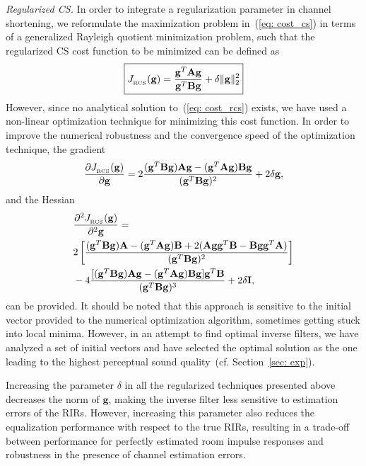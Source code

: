 \documentclass{article}
\begin{document}
\smallskip \noindent \textit{Regularized CS.} \enspace In order to integrate a regularization parameter in channel shortening, we reformulate the maximization problem in~(\ref{eq: cost_cs}) in terms of a generalized Rayleigh quotient minimization problem, such that the regularized CS cost function to be minimized can be defined as
\begin{equation}
\label{eq: cost_rcs}
\boxed{J_{{}_{\rm RCS}}(\mathbf{g})= \frac{\mathbf{g}^T {\mathbf{A}} \mathbf{g}}{\mathbf{g}^T {\mathbf{B}} \mathbf{g}} + \delta \|\mathbf{g} \|_2^2}
\end{equation}
However, since no analytical solution to~(\ref{eq: cost_rcs}) exists, we have used a non-linear optimization technique for minimizing this cost function.
In order to improve the numerical robustness and the convergence speed of the optimization technique, the gradient
\begin{equation}
\frac{\partial J_{{}_{\rm RCS}}(\mathbf{g})}{\partial \mathbf{g}} = 2 \frac{(\mathbf{g}^T \mathbf{B} \mathbf{g})\mathbf{A}\mathbf{g} - (\mathbf{g}^T \mathbf{A} \mathbf{g})\mathbf{B}\mathbf{g} }{(\mathbf{g}^T \mathbf{B} \mathbf{g})^2} + 2 \delta \mathbf{g},
\end{equation}
and the Hessian
\begin{equation}
\begin{split}
& \frac{\partial ^2 J_{{}_{\rm RCS}}(\mathbf{g})}{\partial^2 \mathbf{g}}  = \\
& 2 \left[ \frac{(\mathbf{g}^T \mathbf{B} \mathbf{g}) \mathbf{A} - (\mathbf{g}^T \mathbf{A} \mathbf{g}) \mathbf{B} + 2 ( \mathbf{A} \mathbf{g} \mathbf{g}^T \mathbf{B} - \mathbf{B} \mathbf{g} \mathbf{g}^T \mathbf{A})}{(\mathbf{g}^T \mathbf{B}\mathbf{g})^2} \right] \\
& -  4 \frac{[(\mathbf{g}^T\mathbf{B}\mathbf{g})\mathbf{A}\mathbf{g} - (\mathbf{g}^T\mathbf{A}\mathbf{g})\mathbf{B}\mathbf{g}] \mathbf{g}^T \mathbf{B}}{(\mathbf{g}^T\mathbf{B}\mathbf{g})^3} + 2 \delta \mathbf{I},
\end{split}
\end{equation}
can be provided. 
It should be noted that this approach is sensitive to the initial vector provided to the numerical optimization algorithm, sometimes getting stuck into local minima.
However, in an attempt to find optimal inverse filters, we have analyzed a set of initial vectors and have selected the optimal solution as the one leading to the highest perceptual sound quality~(cf. Section~\ref{sec: exp}).

Increasing the parameter $\delta$ in all the regularized techniques presented above decreases the norm of $\mathbf{g}$, making the inverse filter less sensitive to estimation errors of the RIRs. 
However, increasing this parameter also reduces the equalization performance with respect to the true RIRs, resulting in a trade-off between performance for perfectly estimated room impulse responses and robustness in the presence of channel estimation errors.
\end{document}
